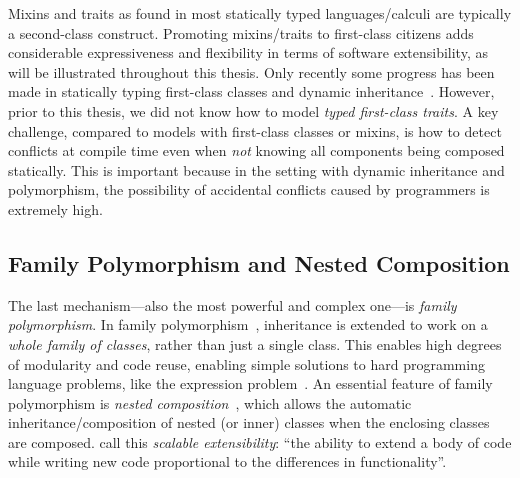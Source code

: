 Mixins and traits as found in most statically typed languages/calculi are
typically a second-class construct. Promoting mixins/traits to first-class
citizens adds considerable expressiveness and flexibility in terms of software
extensibility, as will be illustrated throughout this thesis. Only recently some
progress has been made in statically typing first-class classes and dynamic
inheritance~\citep{DBLP:conf/oopsla/TakikawaSDTF12,DBLP:conf/ecoop/LeeASP15}.
However, prior to this thesis, we did not know how to model \emph{typed
  first-class traits}. A key challenge, compared to models with first-class
classes or mixins, is how to detect conflicts at compile time even when \emph{not}
knowing all components being composed statically. This is important because in
the setting with dynamic inheritance and polymorphism, the possibility of
accidental conflicts caused by programmers is extremely high.



\subsection{Family Polymorphism and Nested Composition}

The last mechanism---also the most powerful and complex one---is \emph{family
  polymorphism}. In family polymorphism~\citep{Ernst_2001}, inheritance is
extended to work on a \emph{whole family of classes}, rather than just a single
class. This enables high degrees of modularity and code reuse, enabling simple
solutions to hard programming language problems, like the expression
problem~\citep{wadler1998expression}. An essential feature of family
polymorphism is \emph{nested composition}~\citep{Corradi_2012,
  ErnstVirtual,Nystrom_2004}, which allows the automatic inheritance/composition
of nested (or inner) classes when the enclosing classes are composed.
\citet{Nystrom_2004} call this \emph{scalable extensibility}: ``the ability to
extend a body of code while writing new code proportional to the differences in
functionality''.

